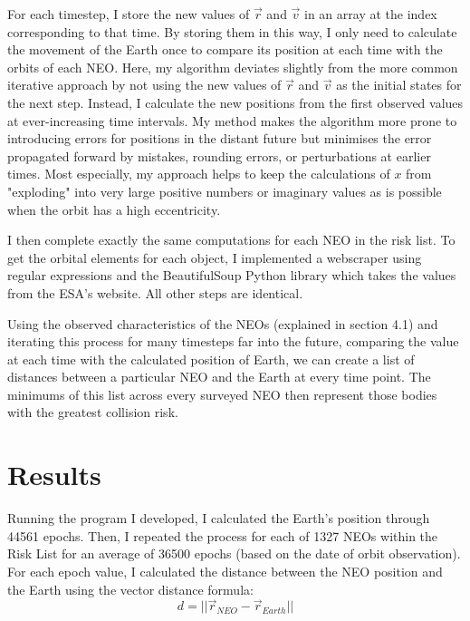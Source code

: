 \documentclass[12pt]{article}
\begin{document}
For each timestep, I store the new values of $\vec{r}$ and $\vec{v}$ in an array at the index corresponding to that time. By storing them in this way, I only need to calculate the movement of the Earth once to compare its position at each time with the orbits of each NEO. Here, my algorithm deviates slightly from the more common iterative approach by not using the new values of $\vec{r}$ and $\vec{v}$ as the initial states for the next step. Instead, I calculate the new positions from the first observed values at ever-increasing time intervals. My method makes the algorithm more prone to introducing errors for positions in the distant future but minimises the error propagated forward by mistakes, rounding errors, or perturbations at earlier times. Most especially, my approach helps to keep the calculations of $x$ from "exploding" into very large positive numbers or imaginary values as is possible when the orbit has a high eccentricity. 

I then complete exactly the same computations for each NEO in the risk list. To get the orbital elements for each object, I implemented a webscraper using regular expressions and the BeautifulSoup Python library which takes the values from the ESA's website. All other steps are identical. 

Using the observed characteristics of the NEOs (explained in section 4.1) and iterating this process for many timesteps far into the future,  comparing the value at each time with the calculated position of Earth, we can create a list of distances between a particular NEO and the Earth at every time point. The minimums of this list across every surveyed NEO then represent those bodies with the greatest collision risk.

\section{Results}
Running the program I developed, I calculated the Earth's position through 44561 epochs. Then, I repeated the process for each of 1327 NEOs within the Risk List for an average of 36500 epochs (based on the date of orbit observation). For each epoch value, I calculated the distance between the NEO position and the Earth using the vector distance formula:
$$d = ||\vec{r}_{NEO} - \vec{r}_{Earth}||$$
\end{document}

